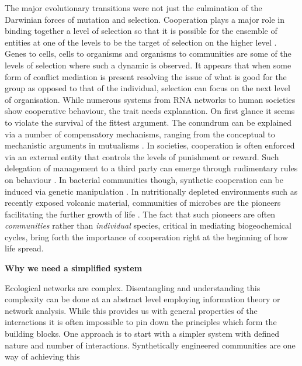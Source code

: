 The major evolutionary transitions were not just the culmination of the Darwinian forces of mutation and selection. 
Cooperation plays a major role in binding together a level of selection so that it is possible for the ensemble of entities at one of the levels to be the target of selection on the higher level \citep{maynard-smith:book:1995a}.
Genes to cells, cells to organisms and organisms to communities are some of the levels of selection where such a dynamic is observed.
It appears that when some form of conflict mediation is present resolving the issue of what is good for the group as opposed to that of the individual, selection can focus on the next level of organisation.
While numerous systems from RNA networks to human societies show cooperative behaviour, the trait needs explanation.
On first glance it seems to violate the survival of the fittest argument.
The conundrum can be explained via a number of compensatory mechanisms, ranging from the conceptual \citep{nowak:Science:2006} to mechanistic arguments in mutualisms \citep{akcay:bookchapter:2015}.
In societies, cooperation is often enforced via an external entity that controls the levels of punishment or reward. 
Such delegation of management to a third party can emerge through rudimentary rules on behaviour \citep{sigmund:Nature:2010}.
In bacterial communities though, synthetic cooperation can be induced via genetic manipulation \citep{shou:elife:2015,campbell:elife:2015}.
In nutritionally depleted environments such as recently exposed volcanic material, communities of microbes are the pioneers facilitating the further growth of life \citep{kelly:MicEco:2014,fujimura:SciRep:2016}.
The fact that such pioneers are often \textit{communities} rather than \textit{individual} species,  critical in mediating biogeochemical cycles, bring forth the importance of cooperation right at the beginning of how life spread.

\textbf{Why we need a simplified system}

Ecological networks are complex.
Disentangling and understanding this complexity can be done at an abstract level employing information theory or network analysis.
While this provides us with general properties of the interactions it is often impossible to pin down the principles which form the building blocks.
One approach is to start with a simpler system with defined nature and number of interactions.
Synthetically engineered communities are one way of achieving this \citep{momeni:elife:2013}